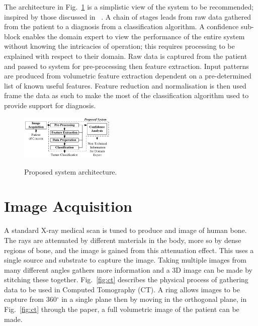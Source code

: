 \documentclass[journal]{IEEEtran}
\begin{document}
The architecture in Fig.~\ref{fig:Proposed} is a simplistic view of the system to be recommended; inspired by those discussed in ~\cite{ahmed2011efficacy,kumar2011classification,sachdeva2011multiclass}.
A chain of stages leads from raw data gathered from the patient to a diagnosis from a classification algorithm.
A confidence sub-block enables the domain expert to view the performance of the entire system without knowing the intricacies of operation; this requires processing to be explained with respect to their domain.
Raw data is captured from the patient and passed to system for pre-processing then feature extraction.
Input patterns are produced from volumetric feature extraction dependent on a pre-determined list of known useful features. 
Feature reduction and normalisation is then used frame the data as such to make the most of the classification algorithm used to provide support for diagnosis.

\begin{figure}[!htb]
   \centering
   \includegraphics[width = 0.4\textwidth]{Figures/Proposed.pdf}
   \label{fig:Proposed}
   \caption{Proposed system architecture.}
\end{figure}











\section{Image Acquisition}
\label{sec:image}

A standard X-ray medical scan is tuned to produce and image of human bone.
The rays are attenuated by different materials in the body, more so by dense regions of bone, and the image is gained from this attenuation effect.  
This uses a single source and substrate to capture the image.
Taking multiple images from many different angles gathers more information and a 3D image can be made by stitching these together.
Fig.~\ref{fig:ct} describes the physical process of gathering data to be used in Computed Tomography (CT).
A ring allows images to be capture from 360$^{\circ}$ in a single plane then by moving in the orthogonal plane, in Fig.~\ref{fig:ct} through the paper, a full volumetric image of the patient can be made. 
\end{document}
